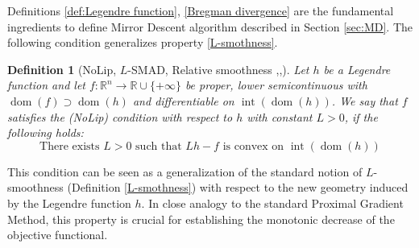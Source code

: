 \documentclass[letterpaper]{article}
\newcommand{\x}{\mathbf{x}}
\newcommand{\y}{\mathbf{y}}
\newcommand{\prox}{\mathrm{prox}}
\newtheorem{definition}{Definition}
\begin{document}
Definitions \ref{def:Legendre function}, \ref{Bregman divergence} are the fundamental ingredients to define Mirror Descent algorithm described in Section \ref{sec:MD}. The following condition generalizes property \eqref{L-smothness}.
\begin{definition}[NoLip, $L$-SMAD, Relative smoothness \cite{nolip},\cite{Bolte2018},\cite{RelativeSmoothness}] \label{NoLip}
Let $h$ be a Legendre function and let $f:\mathbb{R}^n \rightarrow \mathbb{R} \cup \{+\infty\}$ be proper, lower semicontinuous with $\operatorname{dom}(f) \supset \operatorname{dom}(h)$ and differentiable on $\operatorname{int}(\operatorname{dom}(h))$.
We say that $f$ satisfies the (NoLip) condition with respect to $h$ with constant $L>0$, if the following holds:
\begin{equation}
   \text{There exists } L>0 \text{ such that } Lh-f \text{ is convex on $\operatorname{int}(\operatorname{dom}(h))$} \label{eq nolip}   
\end{equation}
\end{definition}
This condition can be seen as a generalization of the standard notion of $L$-smoothness (Definition \ref{L-smothness}) with respect to the new geometry induced by the Legendre function $h$. In close analogy to the standard Proximal Gradient Method, this property is crucial for establishing the monotonic decrease of the objective functional.


\end{document}
